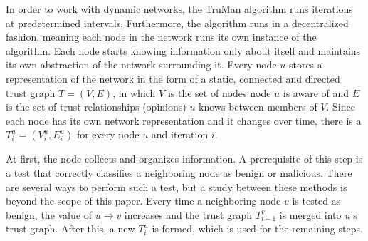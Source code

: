 \documentclass[conference]{IEEEtran}
\begin{document}

In order to work with dynamic networks, the TruMan algorithm runs iterations at predetermined intervals.
Furthermore, the algorithm runs in a decentralized fashion, meaning each node in the network runs its own instance of the algorithm.
Each node starts knowing information only about itself and maintains its own abstraction of the network surrounding it.
Every node $u$ stores a representation of the network in the form of a static, connected and directed trust graph $T = (V, E)$, in which $V$ is the set of nodes node $u$ is aware of and $E$ is the set of trust relationships (opinions) $u$ knows between members of $V$.
Since each node has its own network representation and it changes over time, there is a $T^u_i = (V^u_i, E^u_i)$ for every node $u$ and iteration $i$.



At first, the node collects and organizes information.
A prerequisite of this step is a test that correctly classifies a neighboring node as benign or malicious.
There are several ways to perform such a test, but a study between these methods is beyond the scope of this paper.
Every time a neighboring node $v$ is tested as benign, the value of $u \rightarrow v$ increases and the trust graph $T^v_{i-1}$ is merged into $u$'s trust graph.
After this, a new $T^u_i$ is formed, which is used for the remaining steps.

\end{document}
